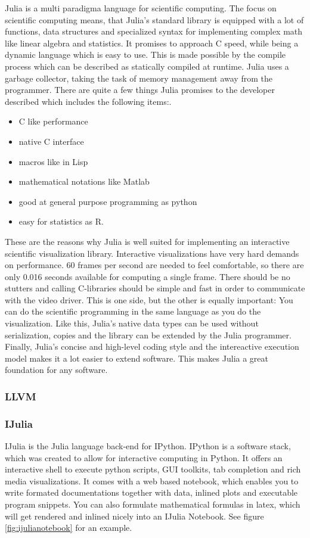 Julia is a multi paradigma language for scientific computing.
The focus on scientific computing means, that Julia's standard library is equipped with a lot of functions, data structures and specialized syntax for implementing complex math like linear algebra and statistics.
It promises to approach C speed, while being a dynamic language which is easy to use.
This is made possible by the compile process which can be described as statically compiled at runtime.
Julia uses a garbage collector, taking the task of memory management away from the programmer.
There are quite a few things Julia promises to the developer described which includes the following items:\cite{WhyJulia}.
\begin{itemize}
	\item C like performance
	\item native C interface
	\item macros like in Lisp
	\item mathematical notations like Matlab
	\item good at general purpose programming as python
	\item easy for statistics as R.
\end{itemize}
These are the reasons why Julia is well suited for implementing an interactive scientific visualization library.
Interactive visualizations have very hard demands on performance. 
60 frames per second are needed to feel comfortable, so there are only 0.016 seconds available for computing a single frame.
There should be no stutters and calling C-libraries should be simple and fast in order to communicate with the video driver.
This is one side, but the other is equally important:
You can do the scientific programming in the same language as you do the visualization.
Like this, Julia's native data types can be used without serialization, copies and the library can be extended by the Julia programmer.
Finally, Julia's concise and high-level coding style and the intereactive execution model makes it a lot easier to extend software.
This makes Julia a great foundation for any software.

\subsubsection{\ac{LLVM}}




\subsubsection{IJulia}
IJulia is the Julia language back-end for IPython.
IPython is a software stack, which was created to allow for interactive computing in Python.
It offers an interactive shell to execute python scripts, \ac{GUI} toolkits, tab completion and rich media visualizations.
It comes with a web based notebook, which enables you to write formated documentations together with data, inlined plots and executable program snippets. You can also formulate mathematical formulas in latex, which will get rendered and inlined nicely into an IJulia Notebook.
See figure \ref{fig:ijulianotebook} for an example.

